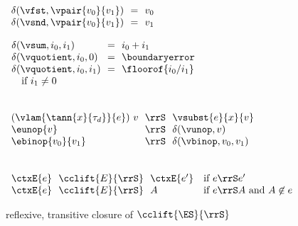 \begin{flushleft}
\begin{mathpar}

\end{mathpar}

\medskip
\begin{minipage}[t]{0.38\columnwidth}
$\begin{array}{l@{~~}c@{~~}l}
  \delta(\vfst, \vpair{v_0}{v_1}) & = & v_0
\\
  \delta(\vsnd, \vpair{v_0}{v_1}) & = & v_1
\end{array}$
\end{minipage}%
\begin{minipage}[t]{0.5\columnwidth}
$\begin{array}{l@{~~}c@{~~}l}
  \delta(\vsum, i_0, i_1) & = & i_0 + i_1
\\
  \delta(\vquotient, i_0, 0) & = & \boundaryerror
\\
  \delta(\vquotient, i_0, i_1) & = & \floorof{i_0 / i_1}
\\ \multicolumn{3}{l}{\mbox{\quad if $i_1 \neq 0$}}
\end{array}$
\end{minipage}


\medskip
{}\\
$\begin{array}{l@{~~}c@{~~}l}
  (\vlam{\tann{x}{\tau_d}}{e})~v & \rrS & \vsubst{e}{x}{v}
\\
  \eunop{v} & \rrS & \delta(\vunop, v)
\\
  \ebinop{v_0}{v_1} & \rrS & \delta(\vbinop, v_0, v_1)
\end{array}$

\medskip
{}\\
$\begin{array}{l@{~~}c@{~~}l l}
\ctxE{e} & \cclift{E}{\rrS} & \ctxE{e'} & \mbox{if $e \rrS e'$}
\\
\ctxE{e} & \cclift{E}{\rrS} & A         & \mbox{if $e \rrS A$ and $A \not\in e$}
\end{array}$

\smallskip
{} reflexive, transitive closure of $\cclift{\ES}{\rrS}$

\end{flushleft}

